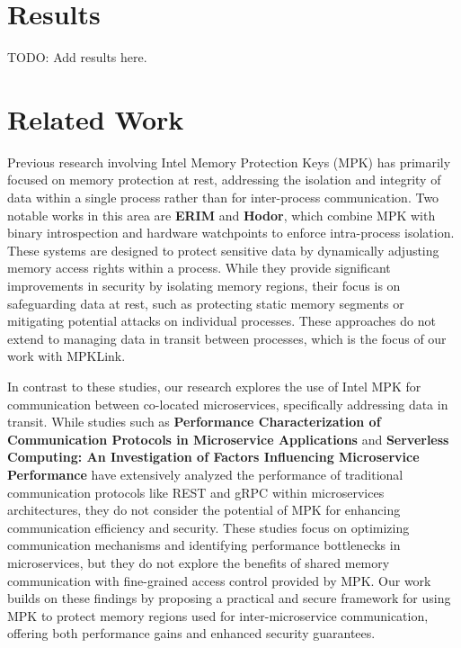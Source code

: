 \documentclass[letterpaper,twocolumn,10pt]{article}
\begin{document}
\section{Results}
TODO: Add results here.

\section{Related Work}
Previous research involving Intel Memory Protection Keys (MPK) has primarily focused on memory protection at rest, addressing the isolation and integrity of data within a single process rather than for inter-process communication.
Two notable works in this area are \textbf{ERIM} and \textbf{Hodor}, which combine MPK with binary introspection and hardware watchpoints to enforce intra-process isolation.
These systems are designed to protect sensitive data by dynamically adjusting memory access rights within a process.
While they provide significant improvements in security by isolating memory regions, their focus is on safeguarding data at rest, such as protecting static memory segments or mitigating potential attacks on individual processes.
These approaches do not extend to managing data in transit between processes, which is the focus of our work with MPKLink.

In contrast to these studies, our research explores the use of Intel MPK for communication between co-located microservices, specifically addressing data in transit.
While studies such as \textbf{Performance Characterization of Communication Protocols in Microservice Applications} and \textbf{Serverless Computing: An Investigation of Factors Influencing Microservice Performance} have extensively analyzed the performance of traditional communication protocols like REST and gRPC within microservices architectures, they do not consider the potential of MPK for enhancing communication efficiency and security.
These studies focus on optimizing communication mechanisms and identifying performance bottlenecks in microservices, but they do not explore the benefits of shared memory communication with fine-grained access control provided by MPK.
Our work builds on these findings by proposing a practical and secure framework for using MPK to protect memory regions used for inter-microservice communication, offering both performance gains and enhanced security guarantees.

\cite{waldspurger02}

\end{document}
